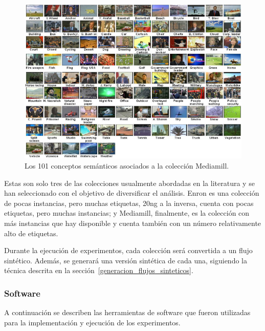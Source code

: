 \begin{figure}[htbp]
	\includegraphics[width=.9\linewidth]{figures/mediamill.jpg}
	\centering
	\caption{Los 101 conceptos semánticos asociados a la colección
		Mediamill.}
	\label{fig:mediamill}
\end{figure}

Estas son solo tres de las colecciones usualmente abordadas en la literatura y
se han seleccionado con el objetivo de diversificar el análisis. Enron es una
colección de pocas instancias, pero muchas etiquetas, 20ng a la inversa, cuenta
con pocas etiquetas, pero muchas instancias; y Mediamill, finalmente, es la
colección con más instancias que hay disponible y cuenta también con un número
relativamente alto de etiquetas.

Durante la ejecución de experimentos, cada colección será convertida a un flujo
sintético. Además, se generará una versión sintética de cada una, siguiendo la
técnica descrita en la sección~\ref{generacion_flujos_sinteticos}.

\subsubsection{Software}

A continuación se describen las herramientas de software que fueron utilizadas
para la implementación y ejecución de los experimentos.

